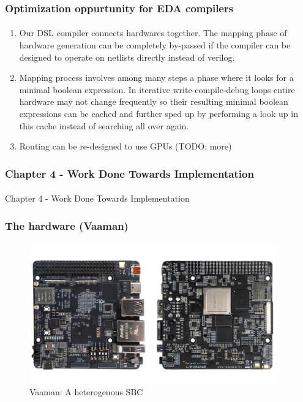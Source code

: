 \documentclass{beamer}
\begin{document}
\begin{frame}[fragile]
  \frametitle{Optimization oppurtunity for EDA compilers}
  \framesubtitle{}
  \begin{enumerate}
    \item Our DSL compiler connects hardwares together. The mapping phase
      of hardware generation can be completely by-passed if the compiler can
      be designed to operate on netlists directly instead of verilog.
    \item Mapping process involves among many steps a phase where it looks
      for a minimal boolean expression. In iterative write-compile-debug loops
      entire hardware may not change frequently so their resulting minimal
      boolean expressions can be cached and further sped up by performing a
      look up in this cache instead of searching all over again.
    \item Routing can be re-designed to use GPUs (TODO: more)
  \end{enumerate}
\end{frame}

\begin{frame}[fragile]
  \frametitle{Chapter 4 - Work Done Towards Implementation}
  \framesubtitle{}
  Chapter 4 - Work Done Towards Implementation
\end{frame}

\begin{frame}[fragile]
  \frametitle{The hardware (Vaaman)}
  \framesubtitle{}
  \begin{figure}
    \centering
    \includegraphics[width=0.95\textwidth]{vaaman.jpg}
    \caption{Vaaman: A heterogenous SBC}
    \label{neuron}
  \end{figure}
\end{frame}
\end{document}

